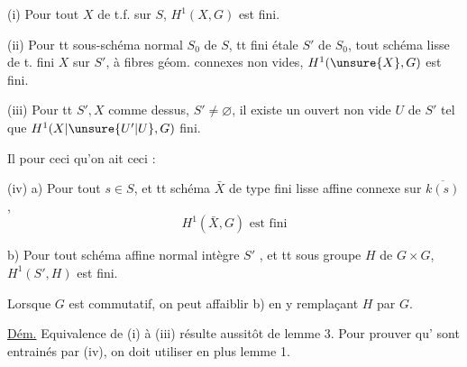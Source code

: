 (i) Pour tout $X$ de t.f. sur $S$, $H^1(X,G)$ est fini.

(ii) Pour tt sous-schéma  normal
$S_0$ de $S$,  tt  fini étale
$S'$ de $S_0$, tout schéma lisse de t. fini $X$ sur $S'$, à fibres géom. connexes non vides, $H^1(\unsure{X},G)$ est fini.

(iii) Pour tt $S',X$ comme dessus, $S'\neq\varnothing$, il existe un ouvert non vide $U$ de $S'$ tel que $H^1(X|\unsure{U'|U},G)$  fini.

Il  pour ceci qu'on ait ceci :

(iv) a) Pour tout $s\in S$, et tt schéma $\bar X$ de type fini lisse affine connexe sur $\overline{k(s)}$,
\[
H^1(\bar X,G)\text{ est fini}
\]

b) Pour tout   schéma affine normal intègre $S'$ ,
et tt sous groupe $H$ de $G\times G$,
$H^1(S',H)$ est fini.

Lorsque $G$ est commutatif, on peut affaiblir b) en y remplaçant $H$ par $G$.


\uline{Dém.} Equivalence de (i) à (iii) résulte aussitôt de lemme 3. Pour prouver qu' sont entrainés par (iv), on doit utiliser en plus lemme 1.
